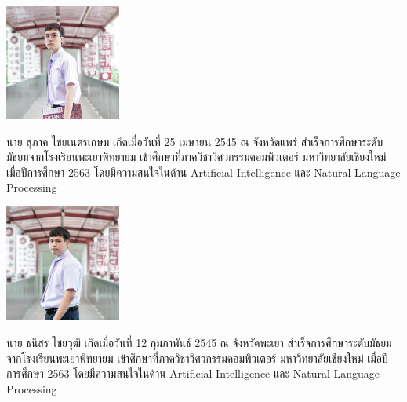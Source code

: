 \documentclass[semifinal]{cpecmu}
\author{นายสุภาค ไชยเนตรเกษม}{Supak Chainetkasem}{630610769}
\author{นายธนิสร ไชยวุฒิ}{Thanisorn Chaiwut}{630610738}
\begin{document}


\pagestyle{empty}\cleardoublepage
\normalspacing \setcounter{page}{1}  \pagestyle{cpecmu}





\ifproject

\fi



\ifproject
\normalspacing
\appendix
% 

\ifglossary\glossarypage\fi

\ifindex\indexpage\fi

\begin{biosketch}
\begin{center}
  \includegraphics[width=1.5in]{supak.jpg}
\end{center}
นาย สุภาค ไชยเนตรเกษม เกิดเมื่อวันที่ 25 เมษายน 2545 ณ จังหวัดแพร่
สำเร็จการศึกษาระดับมัธยมจากโรงเรียนพะเยาพิทยายม เข้าศึกษาที่ภาควิชาวิศวกรรมคอมพิวเตอร์
มหาวิทยาลัยเชียงใหม่ เมื่อปีการศึกษา 2563 โดยมีความสนใจในด้าน Artificial Intelligence
และ Natural Language Processing
\end{biosketch}

\begin{biosketch}
  \begin{center}
    \includegraphics[width=1.5in]{thanisorn.png}
  \end{center}
  นาย ธนิสร ไชยวุฒิ เกิดเมื่อวันที่ 12 กุมภาพันธ์ 2545 ณ จังหวัดพะเยา
  สำเร็จการศึกษาระดับมัธยมจากโรงเรียนพะเยาพิทยายม เข้าศึกษาที่ภาควิชาวิศวกรรมคอมพิวเตอร์
  มหาวิทยาลัยเชียงใหม่ เมื่อปีการศึกษา 2563 โดยมีความสนใจในด้าน Artificial Intelligence
  และ Natural Language Processing
  \end{biosketch}
\fi %
\end{document}
